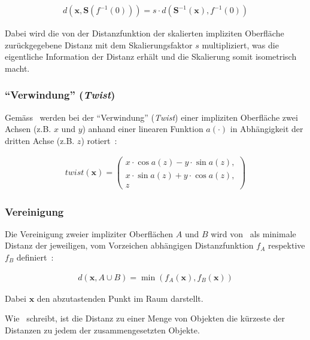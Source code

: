 \begin{gather}
    d(\bm{x}, \bm{S}(f^{-1}(0))) = s \cdot d(\bm{S}^{-1}(\bm{x}), f^{-1}(0))
\end{gather}

Dabei wird die von der Distanzfunktion der skalierten impliziten Oberfläche
zurückgegebene Distanz mit dem Skalierungsfaktor $s$ multipliziert, was die
eigentliche Information der Distanz erhält und die Skalierung somit isometrisch
macht.

\subsubsection{``Verwindung'' (\textit{Twist})}
\label{ssubsec:implicit_surfaces_ops_twist}

Gemäss~\citeauthor{hart_sphere_1994} werden bei der ``Verwindung''
(\textit{Twist}) einer impliziten Oberfläche zwei Achsen (z.B. $x$ und
$y$) anhand einer linearen Funktion $a(\cdot)$ in Abhängigkeit der
dritten Achse (z.B. $z$) rotiert~\parencite[S. 543]{hart_sphere_1994}:

\begin{gather}
    twist(\bm{x}) = \begin{pmatrix} 
        x \cdot \cos{a(z)} - y \cdot \sin{a(z)},\\
        x \cdot \sin{a(z)} + y \cdot \cos{a(z)},\\
        z
    \end{pmatrix}
\end{gather}

\subsubsection{Vereinigung}
\label{ssubsec:implicit_surfaces_ops_union}

Die Vereinigung zweier impliziter Oberflächen $A$ und $B$ wird
von~\citeauthor{hart_sphere_1994} als minimale Distanz der jeweiligen,
vom Vorzeichen abhängigen Distanzfunktion $f_{A}$ respektive $f_{B}$
definiert~\parencite[S. 531 bis 532]{hart_sphere_1994}:

\begin{gather}
    d(\bm{x}, A \cup B) = \min(f_{A}(\bm{x}), f_{B}(\bm{x}))
\end{gather}

Dabei $\bm{x}$ den abzutastenden Punkt im Raum darstellt.

Wie~\citeauthor{hart_sphere_1994} schreibt, ist die Distanz zu einer
Menge von Objekten die kürzeste der Distanzen zu jedem der
zusammengesetzten Objekte.

